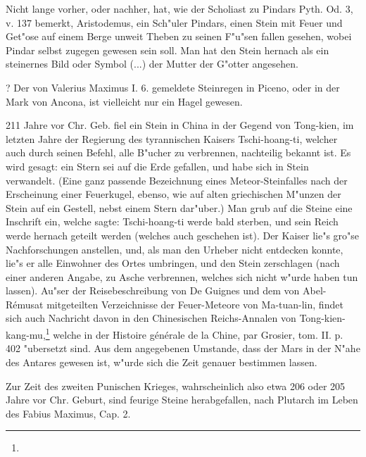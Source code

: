 \documentclass[a4paper, 11pt, oneside, polutonikogreek, german]{article}
\begin{document}
Nicht lange vorher, oder nachher, hat, wie der Scholiast zu Pindars Pyth. Od. 3, v. 137 bemerkt, Aristodemus, ein Sch"uler Pindars, einen Stein mit Feuer und Get"ose auf einem Berge unweit Theben zu seinen F"u"sen fallen gesehen, wobei Pindar selbst zugegen gewesen sein soll. Man hat den Stein hernach als ein steinernes Bild oder Symbol (...) der Mutter der G"otter angesehen.

? Der von Valerius Maximus I. 6. gemeldete Steinregen in Piceno, oder in der Mark von Ancona, ist vielleicht nur ein Hagel gewesen.

211 Jahre vor Chr. Geb. fiel ein Stein in China in der Gegend von Tong-kien, im letzten Jahre der Regierung des tyrannischen Kaisers Tschi-hoang-ti, welcher auch durch seinen Befehl, alle B"ucher zu verbrennen, nachteilig bekannt ist. Es wird gesagt: ein Stern sei auf die Erde gefallen, und habe sich in Stein verwandelt. (Eine ganz passende Bezeichnung eines Meteor-Steinfalles nach der Erscheinung einer Feuerkugel, ebenso, wie auf alten griechischen M"unzen der Stein auf ein Gestell, nebst einem Stern dar"uber.) Man grub auf die Steine eine Inschrift ein, welche sagte: Tschi-hoang-ti werde bald sterben, und sein Reich werde hernach geteilt werden (welches auch geschehen ist). Der Kaiser lie"s gro"se Nachforschungen anstellen, und, als man den Urheber nicht entdecken konnte, lie"s er alle Einwohner des Ortes umbringen, und den Stein zerschlagen (nach einer anderen Angabe, zu Asche verbrennen, welches sich nicht w"urde haben tun lassen). Au"ser der Reisebeschreibung von De Guignes und dem von Abel-Rémusat mitgeteilten Verzeichnisse der Feuer-Meteore von Ma-tuan-lin, findet sich auch Nachricht davon in den Chinesischen Reichs-Annalen von Tong-kien-kang-mu,\footnote{} welche in der Histoire générale de la Chine, par Grosier, tom. II. p. 402 "ubersetzt sind. Aus dem angegebenen Umstande, dass der Mars in der N"ahe des Antares gewesen ist, w"urde sich die Zeit genauer bestimmen lassen.

Zur Zeit des zweiten Punischen Krieges, wahrscheinlich also etwa 206 oder 205 Jahre vor Chr. Geburt, sind feurige Steine herabgefallen, nach Plutarch im Leben des Fabius Maximus, Cap. 2.
\end{document}
